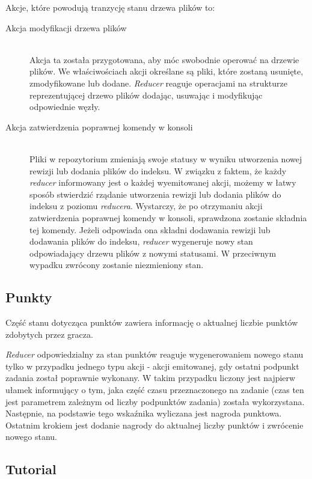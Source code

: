 \documentclass[12pt,a4paper,polish,thesis]{dcsbook}
\begin{document}
{	Akcje, które powodują tranzycję stanu drzewa plików to:
	
	\begin{description}
	\item[Akcja modyfikacji drzewa plików] \hfill \\
	Akcja ta została przygotowana, aby móc swobodnie operować na drzewie plików. We właściwościach akcji określane są pliki, które zostaną usunięte, zmodyfikowane lub dodane. \textit{Reducer} reaguje operacjami na strukturze reprezentującej drzewo plików dodając, usuwając i modyfikując odpowiednie węzły.
	
	\item[Akcja zatwierdzenia poprawnej komendy w konsoli] \hfill \\
	Pliki w repozytorium zmieniają swoje statusy w wyniku utworzenia nowej rewizji lub dodania plików do indeksu. W związku z faktem, że każdy \textit{reducer} informowany jest o każdej wyemitowanej akcji, możemy w łatwy sposób stwierdzić rządanie utworzenia rewizji lub dodania plików do indeksu z poziomu \textit{reducera}. Wystarczy, że po otrzymaniu akcji zatwierdzenia poprawnej komendy w konsoli, sprawdzona zostanie składnia tej komendy. Jeżeli odpowiada ona składni dodawania rewizji lub dodawania plików do indeksu, \textit{reducer} wygeneruje nowy stan odpowiadający drzewu plików z nowymi statusami. W przeciwnym wypadku zwrócony zostanie niezmieniony stan.
	\end{description}
	
	\subsection{Punkty}
	
	Część stanu dotycząca punktów zawiera informację o aktualnej liczbie punktów zdobytych przez gracza.
	
	\textit{Reducer} odpowiedzialny za stan punktów reaguje wygenerowaniem nowego stanu tylko w przypadku jednego typu akcji - akcji emitowanej, gdy ostatni podpunkt zadania został poprawnie wykonany. W takim przypadku liczony jest najpierw ułamek informujący o tym, jaka część czasu przeznaczonego na zadanie (czas ten jest parametrem zależnym od liczby podpunktów zadania) została wykorzystana. Następnie, na podstawie tego wskaźnika wyliczana jest nagroda punktowa. Ostatnim krokiem jest dodanie nagrody do aktualnej liczby punktów i zwrócenie nowego stanu.
	
	\subsection{Tutorial} \label{TutorialStan}
	
}
\end{document}
